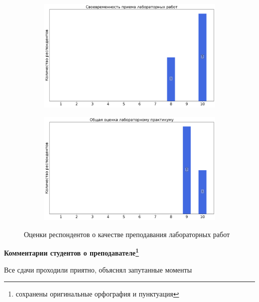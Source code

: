 \begin{figure}[H]
\begin{subfigure}[b]{0.45\textwidth}
                \end{subfigure}
                \begin{subfigure}[b]{0.45\textwidth}
                    \centering
                    \includegraphics[width=\textwidth]{images/3 course/Общая физика - квантовая физика/labniks-marks-Астраханцев Л.-2.png}
                \end{subfigure}
                \begin{subfigure}[b]{0.45\textwidth}
                    \centering
                    \includegraphics[width=\textwidth]{images/3 course/Общая физика - квантовая физика/labniks-marks-Астраханцев Л.-3.png}
                \end{subfigure}	
                \caption{Оценки респондентов о качестве преподавания лабораторных работ}
            \end{figure}

            \textbf{Комментарии студентов о преподавателе\protect\footnote{сохранены оригинальные орфография и пунктуация}}
                \begin{commentbox} 
                    Все сдачи проходили приятно, объяснял запутанные моменты 
                \end{commentbox}


